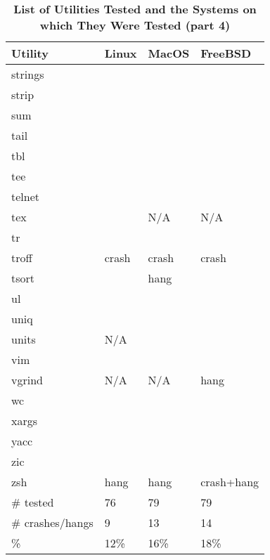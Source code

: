 \begin{table}[htbp]  %
\renewcommand\thetable{1}
\centering  %
 \begin{tabular}{|p{2.5cm}|p{2cm}|p{2cm}|p{2cm}|} 
     \hline
     \hline
        Utility & Linux & MacOS & FreeBSD \\  %
       \hline
       strings &   &   &    \\
       strip &   &   &    \\
       sum &   &   &    \\
       tail &   &   &    \\
       tbl &   &   &    \\
       tee &   &   &    \\
       telnet &   &   &    \\
       tex &   & N/A  & N/A   \\
       tr &   &   &    \\
       troff & crash  & crash  & crash   \\
       tsort &   & hang  &    \\
       ul &   &   &    \\
       uniq &   &   &    \\
       units & N/A  &   &    \\
       vim &   &   &    \\
       vgrind & N/A  & N/A  &  hang  \\
       wc &   &   &    \\
       xargs &   &   &    \\
       yacc &   &   &    \\
       zic &   &   &    \\
       zsh & hang  & hang  & crash+hang   \\
       \hline
       \# tested & 76  & 79  &  79  \\
       \# crashes/hangs & 9  & 13  &  14  \\
       \% & 12\%  & 16\%  & 18\%   \\ 
       \hline
       \hline
   \end{tabular}
   \caption{\textbf{List of Utilities Tested and the Systems on which They Were Tested (part 4)}}  %
\end{table}


